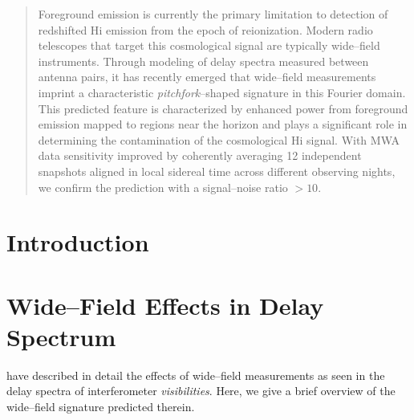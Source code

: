 \documentclass[preprint2,apjl,numberedappendix,twocolappendix,appendixfloats]{emulateapj}
\begin{document}

\begin{abstract}

Foreground emission is currently the primary limitation to detection of redshifted H{\sc i} emission from the epoch of reionization. Modern radio telescopes that target this cosmological signal are typically wide--field instruments. Through modeling of delay spectra measured between antenna pairs, it has recently emerged that wide--field measurements imprint a characteristic {\it pitchfork}--shaped signature in this Fourier domain. This predicted feature is characterized by enhanced power from foreground emission mapped to regions near the horizon and plays a significant role in determining the contamination of the cosmological H{\sc i} signal. With MWA data sensitivity improved by coherently averaging 12 independent snapshots aligned in local sidereal time across different observing nights, we confirm the prediction with a signal--noise ratio $>10$.

\end{abstract}
 

\section{Introduction}\label{sec:intro}



\section{Wide--Field Effects in Delay Spectrum}\label{sec:wide-field}

\citet{thy15} have described in detail the effects of wide--field measurements as seen in the delay spectra of interferometer {\it visibilities}. Here, we give a brief overview of the wide--field signature predicted therein. 
\end{document}
